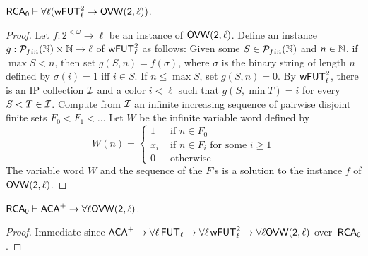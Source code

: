 \begin{theorem}
$\operatorname{\sf{RCA}_0} \vdash \forall \ell(\operatorname{\sf{wFUT}}^2_\ell \to \sf{OVW}(2,\ell))$.
\end{theorem}
\begin{proof}
Let $f : 2^{<\omega} \to \ell$ be an instance of $\sf{OVW}(2,\ell)$.
Define an instance $g : \mathcal{P}_{fin}(\mathbb{N}) \times \mathbb{N} \to \ell$ of $\operatorname{\sf{wFUT}}^2_\ell$ as follows:
Given some $S \in \mathcal{P}_{fin}(\mathbb{N})$ and $n \in \mathbb{N}$, if $\max S < n$, then set $g(S, n) = f(\sigma)$,
where $\sigma$ is the binary string of length $n$ defined by $\sigma(i) = 1$ iff $i \in S$.
If $n \leq \max S$, set $g(S, n) = 0$. By $\operatorname{\sf{wFUT}}^2_\ell$, there is an IP collection $\mathcal{I}$
and a color $i < \ell$ such that $g(S, \min T) = i$ for every $S < T \in \mathcal{I}$.
Compute from $\mathcal{I}$ an infinite increasing sequence of pairwise disjoint finite sets
$F_0 < F_1 < \dots$ Let $W$ be the infinite variable word defined by 
$$
W(n) = \left\{\begin{array}{ll}
	1 & \mbox{ if } n \in F_0\\
	x_i & \mbox{ if } n \in F_i \mbox{ for some } i \geq 1\\
	0 & \mbox{ otherwise}	
\end{array}\right.
$$
The variable word $W$ and the sequence of the $F$'s is a solution to the instance $f$ of $\sf{OVW}(2,\ell)$.
\end{proof}


\begin{corollary}
$\operatorname{\sf{RCA}_0} \vdash \operatorname{\sf{ACA}}^{+} \to \forall \ell \sf{OVW}(2,\ell)$.
\end{corollary}
\begin{proof}
Immediate since $\operatorname{\sf{ACA}}^{+} \rightarrow \forall \ell \operatorname{\sf{FUT}}_\ell \rightarrow \forall \ell \operatorname{\sf{wFUT}}^2_\ell \rightarrow \forall \ell \sf{OVW}(2,\ell)$ over~$\operatorname{\sf{RCA}_0}$.
\end{proof}